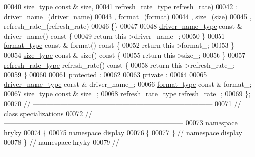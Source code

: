 \begin{DoxyCode}
00040         \hyperlink{classhryky_1_1geometry_1_1coord_1_1_cartesian2_d}{size_type} \textcolor{keyword}{const} & size,
00041         \hyperlink{namespacehryky_1_1display_ac8bdbe1db3aaf491d26848562e9fa29c}{refresh_rate_type} refresh\_rate)
00042         : driver\_name\_(driver\_name)
00043           , format\_(format)
00044           , size\_(size)
00045           , refresh\_rate\_(refresh\_rate)
00046     \{\}
00047 
00048     \hyperlink{classhryky_1_1_string}{driver_name_type} \textcolor{keyword}{const} & driver\_name()\textcolor{keyword}{ const }\{
00049         \textcolor{keywordflow}{return} this->driver\_name\_;
00050     \}
00051     \hyperlink{namespacehryky_1_1display_a8b77ffd7407c2f861e6c4872a2444330}{format_type} \textcolor{keyword}{const} & format()\textcolor{keyword}{ const }\{
00052         \textcolor{keywordflow}{return} this->format\_;
00053     \}
00054     \hyperlink{namespacehryky_1_1display_a88ee3bfa154cce4c6715af0c3f53d062}{size_type} \textcolor{keyword}{const} & size()\textcolor{keyword}{ const }\{
00055         \textcolor{keywordflow}{return} this->size\_;
00056     \}
00057     \hyperlink{namespacehryky_1_1display_ac8bdbe1db3aaf491d26848562e9fa29c}{refresh_rate_type} refresh\_rate()\textcolor{keyword}{ const }\{
00058         \textcolor{keywordflow}{return} this->refresh\_rate\_;
00059     \}
00060 
00061 \textcolor{keyword}{protected} :
00062 
00063 \textcolor{keyword}{private} :
00064 
00065     \hyperlink{namespacehryky_1_1display_a393bfca9f51ab987a1e795c8502c4db4}{driver_name_type} \textcolor{keyword}{const} &    driver\_name\_;
00066     \hyperlink{namespacehryky_1_1display_a8b77ffd7407c2f861e6c4872a2444330}{format_type} \textcolor{keyword}{const} &         format\_;
00067     \hyperlink{namespacehryky_1_1display_a88ee3bfa154cce4c6715af0c3f53d062}{size_type} \textcolor{keyword}{const} &           size\_;
00068     \hyperlink{namespacehryky_1_1display_ac8bdbe1db3aaf491d26848562e9fa29c}{refresh_rate_type}           refresh\_rate\_;
00069 \};
00070 \textcolor{comment}{//
      ------------------------------------------------------------------------------}
00071 \textcolor{comment}{// class specializations}
00072 \textcolor{comment}{//
      ------------------------------------------------------------------------------}
00073 \textcolor{keyword}{namespace }hryky
00074 \{
00075 \textcolor{keyword}{namespace }display
00076 \{
00077 \} \textcolor{comment}{// namespace display}
00078 \} \textcolor{comment}{// namespace hryky}
00079 \textcolor{comment}{//
      ------------------------------------------------------------------------------}

\end{DoxyCode}
